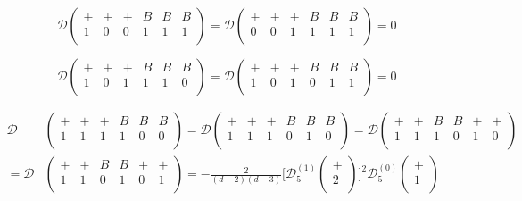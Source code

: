\begin{equation}
\mathcal{D}
\begin{pmatrix}
+ & + & + & B & B & B \\
1 & 0 & 0 & 1 & 1 & 1  \\
\end{pmatrix} = 
\mathcal{D}
\begin{pmatrix}
+ & + & + & B & B & B \\
0 & 0 & 1 & 1 & 1 & 1  \\
\end{pmatrix} = 0
\end{equation}

\begin{equation}
\mathcal{D}
\begin{pmatrix}
+ & + & + & B & B & B \\
1 & 0 & 1 & 1 & 1 & 0  \\
\end{pmatrix} = 
\mathcal{D}
\begin{pmatrix}
+ & + & + & B & B & B \\
1 & 0 & 1 & 0 & 1 & 1  \\
\end{pmatrix} = 0
\end{equation}

\begin{equation}
\begin{split}
\mathcal{D}&
\begin{pmatrix}
+ & + & + & B & B & B \\
1 & 1 & 1 & 1 & 0 & 0  \\
\end{pmatrix} = 
\mathcal{D}
\begin{pmatrix}
+ & + & + & B & B & B \\
1 & 1 & 1 & 0 & 1 & 0  \\
\end{pmatrix} =
\mathcal{D}
\begin{pmatrix}
+ & + & B & B & + & + \\
1 & 1 & 1 & 0 & 1 & 0  \\
\end{pmatrix} \\
=\mathcal{D}&
\begin{pmatrix}
+ & + & B & B & + & + \\
1 & 1 & 0 & 1 & 0 & 1  \\
\end{pmatrix} =
-\frac{2}{(d-2)(d-3)}
\Biggl[\mathcal{D}_5^{(1)}
\begin{pmatrix}
+ \\
2  \\
\end{pmatrix}\Biggr]^2
\mathcal{D}_5^{(0)}
\begin{pmatrix}
+ \\
1  \\
\end{pmatrix}
\end{split}
\end{equation}

